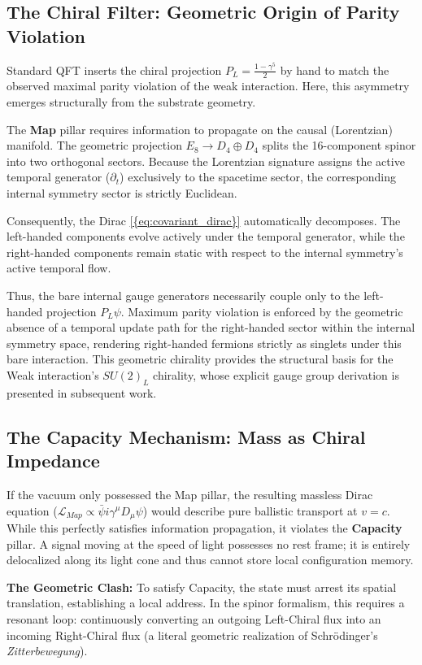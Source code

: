 \subsection{The Chiral Filter: Geometric Origin of Parity Violation}
Standard QFT inserts the chiral projection $P_L = \frac{1-\gamma^5}{2}$ by hand to match the observed maximal parity violation of the weak interaction. Here, this asymmetry emerges structurally from the substrate geometry.

The \textbf{Map} pillar requires information to propagate on the causal (Lorentzian) manifold. The geometric projection $E_8 \to D_4 \oplus D_4$ splits the 16-component spinor into two orthogonal sectors. Because the Lorentzian signature assigns the active temporal generator ($\partial_t$) exclusively to the spacetime sector, the corresponding internal symmetry sector is strictly Euclidean. 

Consequently, the Dirac \cref{{eq:covariant_dirac}} automatically decomposes. The left-handed components evolve actively under the temporal generator, while the right-handed components remain static with respect to the internal symmetry's active temporal flow. 

Thus, the bare internal gauge generators necessarily couple only to the left-handed projection $P_L\psi$. Maximum parity violation is enforced by the geometric absence of a temporal update path for the right-handed sector within the internal symmetry space, rendering right-handed fermions strictly as singlets under this bare interaction. This geometric chirality provides the structural basis for the Weak interaction's $SU(2)_L$ chirality, whose explicit gauge group derivation is presented in subsequent work.

\subsection{The Capacity Mechanism: Mass as Chiral Impedance}
\label{sec:capacity_mechanism}

If the vacuum only possessed the Map pillar, the resulting massless Dirac equation ($\mathcal{L}_{Map} \propto \bar{\psi} i\gamma^\mu D_\mu \psi$) would describe pure ballistic transport at $v=c$. While this perfectly satisfies information propagation, it violates the \textbf{Capacity} pillar. A signal moving at the speed of light possesses no rest frame; it is entirely delocalized along its light cone and thus cannot store local configuration memory.

\textbf{The Geometric Clash:} To satisfy Capacity, the state must arrest its spatial translation, establishing a local address. In the spinor formalism, this requires a resonant loop: continuously converting an outgoing Left-Chiral flux into an incoming Right-Chiral flux (a literal geometric realization of Schr\"{o}dinger's \textit{Zitterbewegung}).

